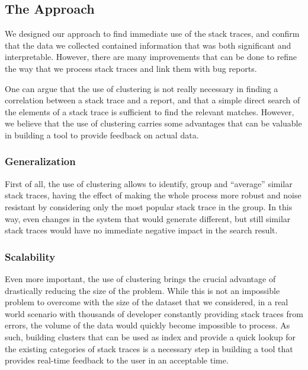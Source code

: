\subsection{The Approach}

We designed our approach to find immediate use of the stack traces, and confirm that the data we collected contained information that was both significant and interpretable.
However, there are many improvements that can be done to refine the way that we process stack traces  and link them with bug reports.

One can argue that the use of clustering is not really necessary in finding a correlation between a stack trace and a report, and that a simple direct search of the elements of a stack trace is sufficient to find the relevant matches.
However, we believe that the use of clustering carries some advantages that can be valuable in building a tool to provide feedback on actual data.


\subsubsection{Generalization}
First of all, the use of clustering allows to identify, group and ``average'' similar stack traces, having the effect of making the whole process more robust and noise resistant by considering only the most popular stack trace in the group.
In this way, even changes in the system that would generate different, but still similar stack traces would have no immediate negative impact in the search result.


\subsubsection{Scalability}
Even more important, the use of clustering brings the crucial advantage of drastically reducing the size of the problem.
While this is not an impossible problem to overcome with the size of the dataset that we considered, in a real world scenario with thousands of developer constantly providing stack traces from errors, the volume of the data would quickly become impossible to process.
As such, building clusters that can be used as index and provide a quick lookup for the existing categories of stack traces is a necessary step in building a tool that provides real-time feedback to the user in an acceptable time.


